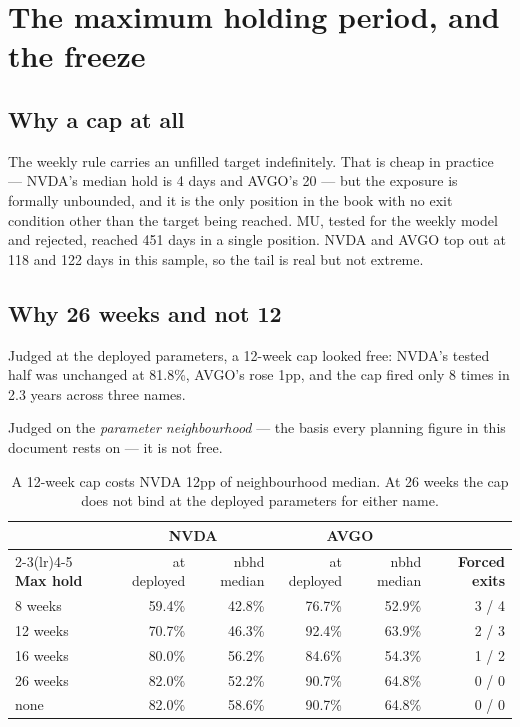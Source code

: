 \documentclass[11pt]{article}
\begin{document}
\section{The maximum holding period, and the freeze}

\subsection{Why a cap at all}

The weekly rule carries an unfilled target indefinitely. That is cheap in practice --- NVDA's
median hold is 4 days and AVGO's 20 --- but the exposure is formally unbounded, and it is the only
position in the book with no exit condition other than the target being reached. MU, tested for
the weekly model and rejected, reached 451 days in a single position. NVDA and AVGO top out at 118
and 122 days in this sample, so the tail is real but not extreme.

\subsection{Why 26 weeks and not 12}

Judged at the deployed parameters, a 12-week cap looked free: NVDA's tested half was unchanged at
81.8\%, AVGO's rose 1pp, and the cap fired only 8 times in 2.3 years across three names.

Judged on the \emph{parameter neighbourhood} --- the basis every planning figure in this
document rests on --- it is not free.

\begin{table}[H]\centering\small
\begin{tabular}{lrrrrr}
\toprule
& \multicolumn{2}{c}{\textbf{NVDA}} & \multicolumn{2}{c}{\textbf{AVGO}} &\\
\cmidrule(lr){2-3}\cmidrule(lr){4-5}
\textbf{Max hold} & at deployed & nbhd median & at deployed & nbhd median &
\textbf{Forced exits}\\
\midrule
\rowcolor{bcwarn} 8 weeks  & 59.4\% & 42.8\% & 76.7\% & 52.9\% & 3 / 4\\
\rowcolor{bcwarn} 12 weeks & 70.7\% & 46.3\% & 92.4\% & 63.9\% & 2 / 3\\
16 weeks & 80.0\% & 56.2\% & 84.6\% & 54.3\% & 1 / 2\\
\rowcolor{bckeep} 26 weeks & 82.0\% & 52.2\% & 90.7\% & 64.8\% & 0 / 0\\
none & 82.0\% & 58.6\% & 90.7\% & 64.8\% & 0 / 0\\
\bottomrule
\end{tabular}
\caption{A 12-week cap costs NVDA 12pp of neighbourhood median. At 26 weeks the cap does not bind
at the deployed parameters for either name.}
\end{table}
\end{document}
